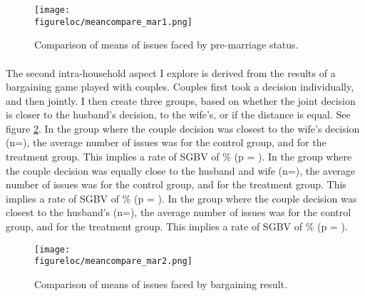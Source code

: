 \documentclass[10pt,a4paper]{scrartcl} %
\newcommand{\figureloc}{C:/Users/Koen/Dropbox/PhD/Papers/CongoGBV/Figures}
\begin{document}
\begin{figure}[H]
  \texttt{[image: \\figureloc/meancompare\_mar1.png]}
  \caption{Comparison of means of issues faced by pre-marriage status.}
  \label{fig:meancompare_mar1}
\end{figure}

\paragraph{}
The second intra-household aspect I explore is derived from the results of a bargaining game played with couples. Couples first took a decision individually, and then jointly. I then create three groups, based on whether the joint decision is closer to the husband's decision, to the wife's, or if the distance is equal. See figure \ref{fig:meancompare_mar2}. In the group where the couple decision was closest to the wife's decision (n=), the average number of issues was  for the control group, and  for the treatment group. This implies a rate of SGBV of \% (p = ). In the group where the couple decision was equally close to the husband and wife (n=), the average number of issues was  for the control group, and  for the treatment group. This implies a rate of SGBV of \% (p = ). In the group where the couple decision was closest to the husband's (n=), the average number of issues was  for the control group, and  for the treatment group. This implies a rate of SGBV of \% (p = ).

\begin{figure}[H]
  \texttt{[image: \\figureloc/meancompare\_mar2.png]}
  \caption{Comparison of means of issues faced by bargaining result.}
  \label{fig:meancompare_mar2}
\end{figure}
\end{document}
